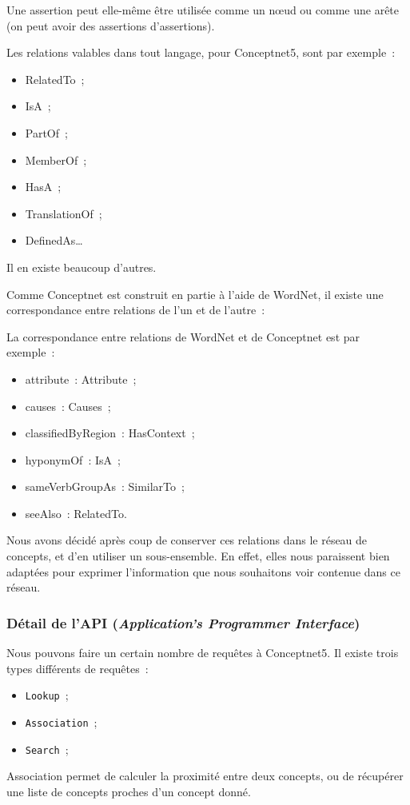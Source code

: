 \documentclass[a4paper, 12pt]{article}
\newcommand{\ang}[1]{\textit{#1}}%
\begin{document}
Une assertion peut elle-même être utilisée comme un n\oe{}ud ou comme une arête (on peut avoir des assertions d'assertions).

Les relations valables dans tout langage, pour Conceptnet5, sont par exemple~:
\begin{itemize}
 \item RelatedTo~;
 \item IsA~;
 \item PartOf~;
 \item MemberOf~;
 \item HasA~;
 \item TranslationOf~;
 \item DefinedAs\ldots{}
\end{itemize}

Il en existe beaucoup d'autres.

Comme Conceptnet est construit en partie à l'aide de WordNet, il existe une correspondance entre relations de l'un et de l'autre~:

La correspondance entre relations de WordNet et de Conceptnet est par exemple~:
\begin{itemize}
 \item attribute~: Attribute~;
 \item causes~: Causes~;
 \item classifiedByRegion~: HasContext~;
 \item hyponymOf~: IsA~;
 \item sameVerbGroupAs~: SimilarTo~;
 \item seeAlso~: RelatedTo.
\end{itemize}

Nous avons décidé après coup de conserver ces relations dans le réseau de concepts, et d'en utiliser un sous-ensemble. En effet, elles nous paraissent bien adaptées pour exprimer l'information que nous souhaitons voir contenue dans ce réseau.

\subsubsection{Détail de l'API (\ang{Application's Programmer Interface})}

Nous pouvons faire un certain nombre de requêtes à Conceptnet5. Il existe trois types différents de requêtes~:
\begin{itemize}
 \item \texttt{Lookup}~;
 \item \texttt{Association}~;
 \item \texttt{Search}~;
\end{itemize}
Association permet de calculer la proximité entre deux concepts, ou de récupérer une liste de concepts proches d'un concept donné.
\end{document}
